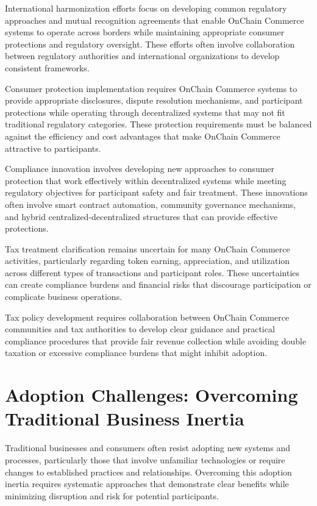 \documentclass[
  Letterpaper,
]{scrbook}
\begin{document}
International harmonization efforts focus on developing common
regulatory approaches and mutual recognition agreements that enable
OnChain Commerce systems to operate across borders while maintaining
appropriate consumer protections and regulatory oversight. These efforts
often involve collaboration between regulatory authorities and
international organizations to develop consistent frameworks.

Consumer protection implementation requires OnChain Commerce systems to
provide appropriate disclosures, dispute resolution mechanisms, and
participant protections while operating through decentralized systems
that may not fit traditional regulatory categories. These protection
requirements must be balanced against the efficiency and cost advantages
that make OnChain Commerce attractive to participants.

Compliance innovation involves developing new approaches to consumer
protection that work effectively within decentralized systems while
meeting regulatory objectives for participant safety and fair treatment.
These innovations often involve smart contract automation, community
governance mechanisms, and hybrid centralized-decentralized structures
that can provide effective protections.

Tax treatment clarification remains uncertain for many OnChain Commerce
activities, particularly regarding token earning, appreciation, and
utilization across different types of transactions and participant
roles. These uncertainties can create compliance burdens and financial
risks that discourage participation or complicate business operations.

Tax policy development requires collaboration between OnChain Commerce
communities and tax authorities to develop clear guidance and practical
compliance procedures that provide fair revenue collection while
avoiding double taxation or excessive compliance burdens that might
inhibit adoption.

\section{Adoption Challenges: Overcoming Traditional Business
Inertia}\label{adoption-challenges-overcoming-traditional-business-inertia}

Traditional businesses and consumers often resist adopting new systems
and processes, particularly those that involve unfamiliar technologies
or require changes to established practices and relationships.
Overcoming this adoption inertia requires systematic approaches that
demonstrate clear benefits while minimizing disruption and risk for
potential participants.
\end{document}
